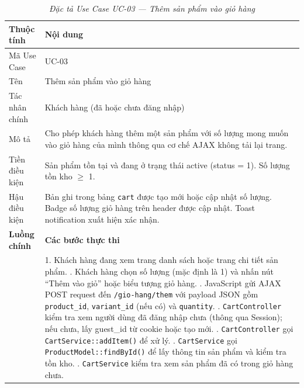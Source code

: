 \documentclass[11pt, a4paper]{article}
\begin{document}
\begin{table}[H]
    \centering
    \small
    \setlength{\tabcolsep}{2pt}
    \renewcommand{\arraystretch}{2.0}
    \caption{\textit{Đặc tả Use Case UC-03 --- Thêm sản phẩm vào giỏ hàng}}
    \vspace{0.3cm}
    \begin{tabularx}{\linewidth}{|>{\raggedright\arraybackslash}p{3.3cm}|Y|}
        \hline
        \textbf{Thuộc tính} & \textbf{Nội dung} \\ \hline
        Mã Use Case & UC-03 \\ \hline
        Tên & Thêm sản phẩm vào giỏ hàng \\ \hline
        Tác nhân chính & Khách hàng (đã hoặc chưa đăng nhập) \\ \hline
        Mô tả & Cho phép khách hàng thêm một sản phẩm với số lượng mong muốn vào giỏ hàng của mình thông qua cơ chế AJAX không tải lại trang. \\ \hline
        Tiền điều kiện & Sản phẩm tồn tại và đang ở trạng thái active (status = 1). Số lượng tồn kho $\geq$ 1. \\ \hline
        Hậu điều kiện & Bản ghi trong bảng \texttt{cart} được tạo mới hoặc cập nhật số lượng. Badge số lượng giỏ hàng trên header được cập nhật. Toast notification xuất hiện xác nhận. \\ \hline
        \textbf{Luồng chính} & \textbf{Các bước thực thi} \\ \hline
        & 1. Khách hàng đang xem trang danh sách hoặc trang chi tiết sản phẩm. . Khách hàng chọn số lượng (mặc định là 1) và nhấn nút ``Thêm vào giỏ'' hoặc biểu tượng giỏ hàng. . JavaScript gửi AJAX POST request đến \texttt{/gio-hang/them} với payload JSON gồm \texttt{product\_id}, \texttt{variant\_id} (nếu có) và \texttt{quantity}. . \texttt{CartController} kiểm tra xem người dùng đã đăng nhập chưa (thông qua Session); nếu chưa, lấy guest\_id từ cookie hoặc tạo mới. . \texttt{CartController} gọi \texttt{CartService::addItem()} để xử lý. . \texttt{CartService} gọi \texttt{ProductModel::findById()} để lấy thông tin sản phẩm và kiểm tra tồn kho. . \texttt{CartService} kiểm tra xem sản phẩm đã có trong giỏ hàng chưa. \newline

\end{tabularx}
\end{table}
\end{document}
